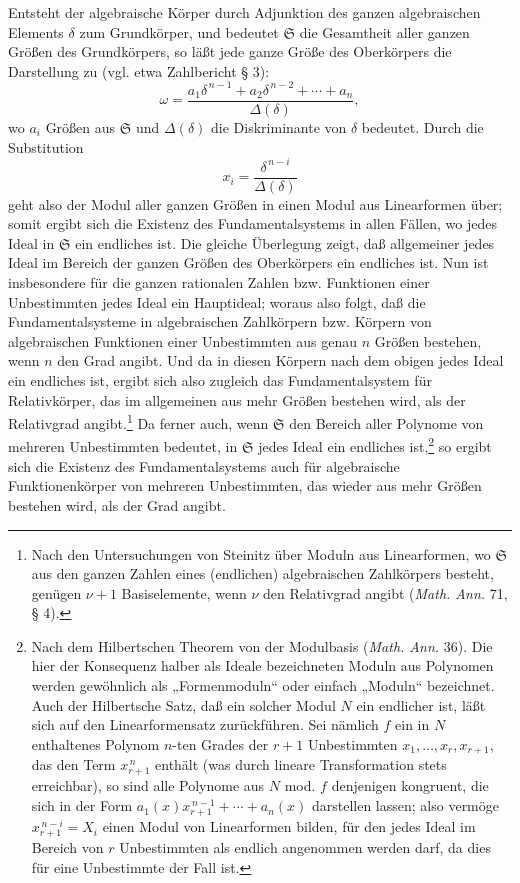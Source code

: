 \documentclass[11pt]{article}
\providecommand{\frS}{\mathfrak S}
\begin{document}
Entsteht der algebraische Körper durch Adjunktion des ganzen algebraischen Elements \(\delta\) zum Grundkörper, und bedeutet \(\frS\) die Gesamtheit aller ganzen Größen des Grundkörpers, so läßt jede ganze Größe des Oberkörpers die Darstellung zu (vgl. etwa Zahlbericht § 3):
\[
\omega=\frac{a_1\delta^{\,n-1}+a_2\delta^{\,n-2}+\cdots+a_n}{\Delta(\delta)},
\]
wo \(a_i\) Größen aus \(\frS\) und \(\Delta(\delta)\) die Diskriminante von \(\delta\) bedeutet. Durch die Substitution
\[
x_i=\frac{\delta^{\,n-i}}{\Delta(\delta)}
\]
geht also der Modul aller ganzen Größen in einen Modul aus Linearformen über; somit ergibt sich die Existenz des Fundamentalsystems in allen Fällen, wo jedes Ideal in \(\frS\) ein endliches ist. Die gleiche Überlegung zeigt, daß allgemeiner jedes Ideal im Bereich der ganzen Größen des Oberkörpers ein endliches ist. Nun ist insbesondere für die ganzen rationalen Zahlen bzw. Funktionen einer Unbestimmten jedes Ideal ein Hauptideal; woraus also folgt, daß die Fundamentalsysteme in algebraischen Zahlkörpern bzw. Körpern von algebraischen Funktionen einer Unbestimmten aus genau \(n\) Größen bestehen, wenn \(n\) den Grad angibt. Und da in diesen Körpern nach dem obigen jedes Ideal ein endliches ist, ergibt sich also zugleich das Fundamentalsystem für Relativkörper, das im allgemeinen aus mehr Größen bestehen wird, als der Relativgrad angibt.\footnote{Nach den Untersuchungen von Steinitz über Moduln aus Linearformen, wo \(\frS\) aus den ganzen Zahlen eines (endlichen) algebraischen Zahlkörpers besteht, genügen \(\nu+1\) Basiselemente, wenn \(\nu\) den Relativgrad angibt (\emph{Math. Ann.} 71, § 4).} Da ferner auch, wenn \(\frS\) den Bereich aller Polynome von mehreren Unbestimmten bedeutet, in \(\frS\) jedes Ideal ein endliches ist,\footnote{Nach dem Hilbertschen Theorem von der Modulbasis (\emph{Math. Ann.} 36). Die hier der Konsequenz halber als Ideale bezeichneten Moduln aus Polynomen werden gewöhnlich als „Formenmoduln“ oder einfach „Moduln“ bezeichnet. Auch der Hilbertsche Satz, daß ein solcher Modul \(N\) ein endlicher ist, läßt sich auf den Linearformensatz zurückführen. Sei nämlich \(f\) ein in \(N\) enthaltenes Polynom \(n\)-ten Grades der \(r+1\) Unbestimmten \(x_1,\ldots,x_r,x_{r+1}\), das den Term \(x_{r+1}^{\,n}\) enthält (was durch lineare Transformation stets erreichbar), so sind alle Polynome aus \(N\) mod. \(f\) denjenigen kongruent, die sich in der Form \(a_1(x)x_{r+1}^{\,n-1}+\cdots+a_n(x)\) darstellen lassen; also vermöge \(x_{r+1}^{\,n-i}=X_i\) einen Modul von Linearformen bilden, für den jedes Ideal im Bereich von \(r\) Unbestimmten als endlich angenommen werden darf, da dies für eine Unbestimmte der Fall ist.} so ergibt sich die Existenz des Fundamentalsystems auch für algebraische Funktionenkörper von mehreren Unbestimmten, das wieder aus mehr Größen bestehen wird, als der Grad angibt.
\end{document}
